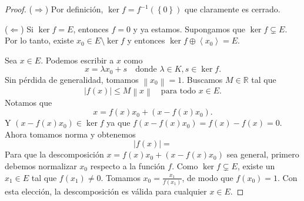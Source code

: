 \begin{proof}
	($\Rightarrow$) Por definición, $\ker f = f^{-1}(\left\{ 0 \right\})$ que claramente es cerrado.

	($\Leftarrow$) Si $\ker f = E$, entonces $f = 0$ y ya estamos. Supongamos que $\ker f \subsetneq E$. Por lo tanto, existe $x_0 \in E \setminus \ker f$ y entonces $\ker f \oplus \left\langle x_0 \right\rangle = E$.

	Sea $x \in E$. Podemos escribir a $x$ como
	\begin{equation*}
		x = \lambda x_0 + s \quad \text{donde } \lambda \in K, s \in \ker f.
	\end{equation*}
	Sin pérdida de generalidad, tomamos $\left\lVert x_0 \right\rVert = 1$.
	Buscamos $M \in \mathbb{R}$ tal que
	\begin{equation*}
		\left\lvert f(x) \right\rvert \leq M \left\lVert x \right\rVert \quad \text{para todo }x \in E.
	\end{equation*}
	Notamos que
	\begin{equation*}
		x = f(x) x_0 + (x - f(x) x_0).
	\end{equation*}
	Y $(x - f(x) x_0) \in \ker f$ ya que $f(x - f(x) x_0) = f(x) - f(x) = 0$. Ahora tomamos norma y obtenemos
	\begin{equation*}
		\left\lvert f(x) \right\rvert =
	\end{equation*}
	Para que la descomposición $x = f(x) x_0 + (x - f(x) x_0)$ sea general, primero debemos normalizar $x_0$ respecto a la función $f$. Como $\ker f \subsetneq E$, existe un $x_1 \in E$ tal que $f(x_1) \ne 0$. Tomamos $x_0 = \frac{x_1}{f(x_1)}$, de modo que $f(x_0) = 1$. Con esta elección, la descomposición es válida para cualquier $x \in E$.


\end{proof}
